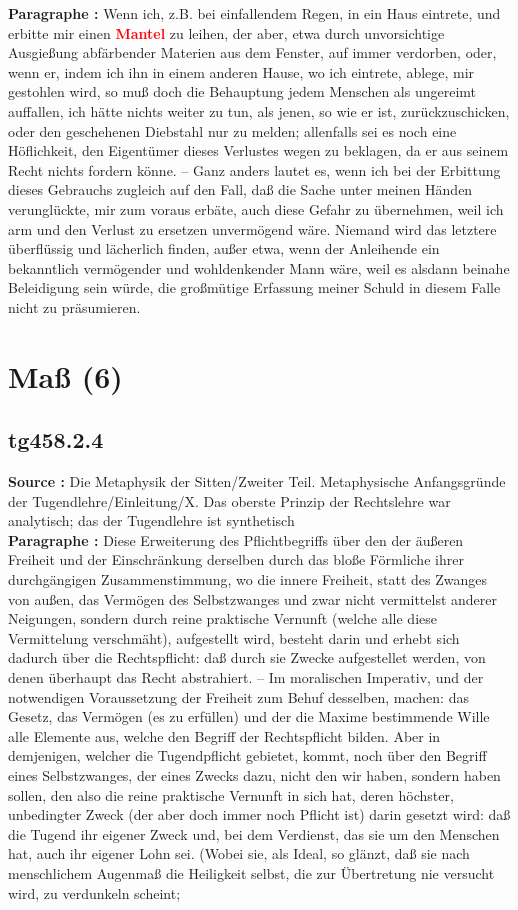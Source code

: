 \documentclass[a4paper,12pt,twoside]{book}
\newcommand{\match}[1]{\textcolor{red}{\textbf{#1}}}
\newcommand{\unnumberedsection}[1]{
	\section*{#1}
	\addcontentsline{toc}{section}{#1}
	\markright{#1}
}
\begin{document}
	\textbf{Paragraphe : }Wenn ich, z.B. bei einfallendem Regen, in ein Haus eintrete, und erbitte mir einen \match{Mantel} zu leihen, der aber, etwa durch unvorsichtige Ausgießung abfärbender Materien aus dem Fenster, auf immer verdorben, oder, wenn er, indem ich ihn in einem anderen Hause, wo ich eintrete, ablege, mir gestohlen wird, so muß doch die Behauptung jedem Menschen als ungereimt auffallen, ich hätte nichts weiter zu tun, als jenen, so wie er ist, zurückzuschicken, oder den geschehenen Diebstahl nur zu melden; allenfalls sei es noch eine Höflichkeit, den Eigentümer dieses Verlustes wegen zu beklagen, da er aus seinem Recht nichts fordern könne. – Ganz anders lautet es, wenn ich bei der Erbittung dieses Gebrauchs zugleich auf den Fall, daß die Sache unter meinen Händen verunglückte, mir zum voraus erbäte, auch diese Gefahr zu übernehmen, weil ich arm und den Verlust zu ersetzen unvermögend wäre. Niemand wird das letztere überflüssig und lächerlich finden, außer etwa, wenn der Anleihende ein bekanntlich vermögender und wohldenkender Mann wäre, weil es alsdann beinahe Beleidigung sein würde, die großmütige Erfassung meiner Schuld in diesem Falle nicht zu präsumieren. 
	
	\unnumberedsection{Maß (6)} 
	\subsection*{tg458.2.4} 
	\textbf{Source : }Die Metaphysik der Sitten/Zweiter Teil. Metaphysische Anfangsgründe der Tugendlehre/Einleitung/X. Das oberste Prinzip der Rechtslehre war analytisch; das der Tugendlehre ist synthetisch\\  
	
	\textbf{Paragraphe : }Diese Erweiterung des Pflichtbegriffs über den der äußeren Freiheit und der Einschränkung derselben durch das bloße Förmliche ihrer durchgängigen Zusammenstimmung, wo die innere Freiheit, statt des Zwanges von außen, das Vermögen des Selbstzwanges und zwar nicht vermittelst anderer Neigungen, sondern durch reine praktische Vernunft (welche alle diese Vermittelung verschmäht), aufgestellt wird, besteht darin und erhebt sich dadurch über die Rechtspflicht: daß durch sie Zwecke aufgestellet werden, von denen überhaupt das Recht abstrahiert. – Im moralischen Imperativ, und der notwendigen Voraussetzung der Freiheit zum Behuf desselben, machen: das Gesetz, das Vermögen (es zu erfüllen) und der die Maxime bestimmende Wille alle Elemente aus, welche den Begriff der Rechtspflicht bilden. Aber in demjenigen, welcher die Tugendpflicht
	gebietet, kommt, noch über den Begriff eines Selbstzwanges, der eines Zwecks dazu, nicht den wir haben, sondern haben sollen, den also die reine praktische Vernunft in sich hat, deren höchster, unbedingter Zweck (der aber doch immer noch Pflicht ist) darin gesetzt wird: daß die Tugend ihr eigener Zweck und, bei dem Verdienst, das sie um den Menschen hat, auch ihr eigener Lohn sei. (Wobei sie, als Ideal, so glänzt, daß sie nach menschlichem Augenmaß die Heiligkeit selbst, die zur Übertretung nie versucht wird, zu verdunkeln scheint;
	
\end{document}
